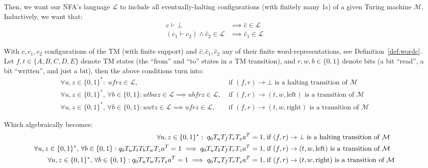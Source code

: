 Then, we want our NFA's language $\mathcal{L}$ to include all eventually-halting configurations (with finitely many 1s) of a given Turing machine $\mathcal{M}$.  Inductively, we want that:
\begin{align*}
  c\vdash\bot                                    & \implies \hat{c} \in \mathcal{L}  \\
  (c_1\vdash c_2)\land \hat{c}_2 \in \mathcal{L} & \implies\hat{c}_1 \in \mathcal{L}
\end{align*}

With $c, c_1, c_2$ configurations of the TM (with finite support) and $\hat{c}, \hat{c}_1, \hat{c}_2$ any of their finite word-representations, see Definition~\ref{def:wordc}. Let $f,t \in \{A,B,C,D,E\}$ denote TM states (the ``from'' and ``to'' states in a TM transition), and $r,w,b \in \{0,1\}$ denote bits (a bit ``read'', a bit ``written'', and just a bit), then the above conditions turn into:
\begin{align*}
  \forall u,z\in\{0, 1\}^*: \; ufrz \in \mathcal{L},\;                                                           & \text{if $(f,r) \to \bot$ is a halting transition of $\mathcal{M}$}
  \\
  \forall u,z\in\{0, 1\}^*,\,\forall b \in \{0, 1\}: utbwz \in \mathcal{L} \implies ubfrz \in \mathcal{L},\;     & \text{if $(f,r) \to (t,w,\text{left})$ is a transition of $\mathcal{M}$}
  \\
  \forall u,z\in\{0, 1\}^*,\,\forall b \in \{0, 1\}: u w t z \in \mathcal{L} \implies u f r z \in \mathcal{L},\; & \text{if $(f,r) \to (t,w,\text{right})$ is a transition of $\mathcal{M}$}
\end{align*}

Which algebraically becomes:
\begin{align*}
  \forall u,z\in\{0, 1\}^*: \; q_0 T_u T_f T_r T_z a^T = 1, \;                                                                           & \text{if $(f,r) \to \bot$ is a halting transition of $\mathcal{M}$}
  \\
  \forall u,z\in\{0, 1\}^*,\,\forall b \in \{0, 1\}: q_0 T_{u} T_t T_b T_w T_{z} a^T = 1 \implies q_0 T_{u} T_b T_f T_r T_{z} a^T = 1,\; & \text{if $(f,r) \to (t,w,\text{left})$ is a transition of $\mathcal{M}$}
  \\
  \forall u,z\in\{0, 1\}^*,\,\forall b \in \{0, 1\}: q_0 T_{u} T_w T_t T_{z} a^T = 1 \implies q_0 T_{u} T_f T_r T_{z} a^T = 1,\;         & \text{if $(f,r) \to (t,w,\text{right})$ is a transition of $\mathcal{M}$}
\end{align*}

